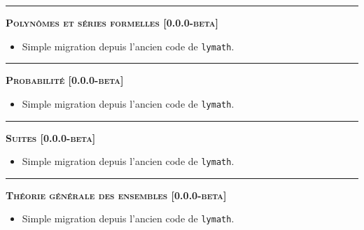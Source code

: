 \documentclass[12pt,a4paper]{book}
\theoremstyle{definition}
\newcommand\separation{
	\medskip
	\hfill\rule{0.5\textwidth}{0.75pt}\hfill
	\medskip
}
\begin{document}
{{\begin{description}
    
    \separation
    
    
    
    
    \begin{center}
        \textbf{\textsc{Polynômes et séries formelles [0.0.0-beta]}}
    \end{center}
    
    \begin{itemize}[itemsep=.5em]
        \item Simple migration depuis l'ancien code de \verb+lymath+.
    \end{itemize}
    
    
    \separation
    
    
    
    
    \begin{center}
        \textbf{\textsc{Probabilité [0.0.0-beta]}}
    \end{center}
    
    \begin{itemize}[itemsep=.5em]
        \item Simple migration depuis l'ancien code de \verb+lymath+.
    \end{itemize}
    
    
    \separation
    
    
    
    
    \begin{center}
        \textbf{\textsc{Suites [0.0.0-beta]}}
    \end{center}
    
    \begin{itemize}[itemsep=.5em]
        \item Simple migration depuis l'ancien code de \verb+lymath+.
    \end{itemize}
    
    
    \separation
    
    
    
    
    \begin{center}
        \textbf{\textsc{Théorie générale des ensembles [0.0.0-beta]}}
    \end{center}
    
    \begin{itemize}[itemsep=.5em]
        \item Simple migration depuis l'ancien code de \verb+lymath+.
    \end{itemize}
    

\end{description}}}
\end{document}
